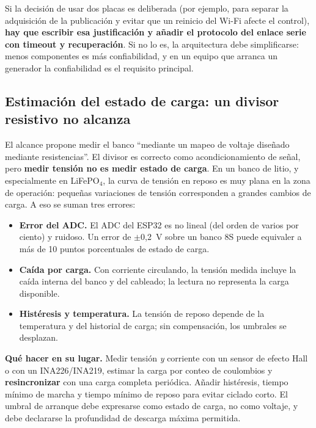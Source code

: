 \documentclass[11pt,a4paper]{article}
\begin{document}
\begin{tcolorbox}[cajaMejora]
Si la decisión de usar dos placas es deliberada (por ejemplo, para separar la adquisición de la publicación y evitar que un reinicio del Wi-Fi afecte el control), \textbf{hay que escribir esa justificación y añadir el protocolo del enlace serie con timeout y recuperación}. Si no lo es, la arquitectura debe simplificarse: menos componentes es más confiabilidad, y en un equipo que arranca un generador la confiabilidad es el requisito principal.
\end{tcolorbox}

\subsection{Estimación del estado de carga: un divisor resistivo no alcanza}

El alcance propone medir el banco ``mediante un mapeo de voltaje diseñado mediante resistencias''. El divisor es correcto como acondicionamiento de señal, pero \textbf{medir tensión no es medir estado de carga}. En un banco de litio, y especialmente en LiFePO$_4$, la curva de tensión en reposo es muy plana en la zona de operación: pequeñas variaciones de tensión corresponden a grandes cambios de carga. A eso se suman tres errores:

\begin{itemize}[leftmargin=1.3em, itemsep=2pt]
  \item \textbf{Error del ADC.} El ADC del ESP32 es no lineal (del orden de varios por ciento) y ruidoso. Un error de $\pm$0,2~V sobre un banco 8S puede equivaler a más de 10 puntos porcentuales de estado de carga.
  \item \textbf{Caída por carga.} Con corriente circulando, la tensión medida incluye la caída interna del banco y del cableado; la lectura no representa la carga disponible.
  \item \textbf{Histéresis y temperatura.} La tensión de reposo depende de la temperatura y del historial de carga; sin compensación, los umbrales se desplazan.
\end{itemize}

\begin{tcolorbox}[cajaRecomendacion]
\textbf{Qué hacer en su lugar.} Medir tensión \emph{y} corriente con un sensor de efecto Hall o con un INA226/INA219, estimar la carga por conteo de coulombios y \textbf{resincronizar} con una carga completa periódica. Añadir histéresis, tiempo mínimo de marcha y tiempo mínimo de reposo para evitar ciclado corto. El umbral de arranque debe expresarse como estado de carga, no como voltaje, y debe declararse la profundidad de descarga máxima permitida.
\end{tcolorbox}
\end{document}
